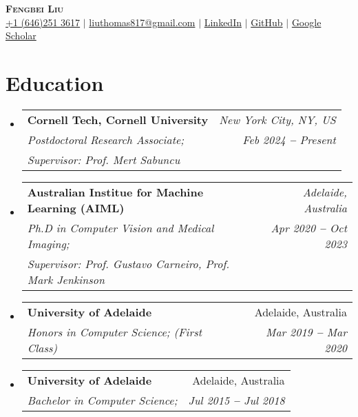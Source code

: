 \documentclass[letterpaper,11pt]{article}
\makeatletter
\newcommand{\resumeSubheading}[4]{
  \vspace{-2pt}\item
    \begin{tabular*}{0.97\textwidth}[t]{l@{\extracolsep{\fill}}r}
      \textbf{#1} & #2 \\
      \textit{\small#3} & \textit{\small #4} \\
    \end{tabular*}\vspace{-7pt}
}
\newcommand{\resumePhdheading}[5]{
  \vspace{-2pt}\item
    \begin{tabular*}{0.97\textwidth}[t]{l@{\extracolsep{\fill}}r}
      \textbf{#1} & \textit{\small #2}\\
      \textit{\small#3} & \textit{\small #4} \\
      \textit{\small #5} \\
    \end{tabular*}\vspace{-7pt}
}
\newcommand{\resumeSubHeadingListStart}{\begin{itemize}[leftmargin=0.15in, label={}]}
\newcommand{\resumeSubHeadingListEnd}{\end{itemize}}
\makeatother
\begin{document}

\begin{center}
    \textbf{\Huge \scshape Fengbei Liu} \\ \vspace{3pt}
    \small
    \faMobile \hspace{.5pt} \href{tel:905314204536}{+1 (646)251 3617}
    $|$
    \faAt \hspace{.5pt} \href{mailto:arasgungore09@gmail.com}{liuthomas817@gmail.com}
    $|$
    \faLinkedinSquare \hspace{.5pt} \href{https://www.linkedin.com/in/fengbei-liu-2bb11b177/}{LinkedIn}
    $|$
    \faGithub \hspace{.5pt} \href{https://github.com/FBLADL?tab=repositories}{GitHub}
    $|$
    \faGlobe \hspace{.5pt} \href{https://scholar.google.com.au/citations?user=oY_qRxMAAAAJ&hl}{Google Scholar}
\end{center}




\section{Education}
  \vspace{3pt}
  \resumeSubHeadingListStart

    

    \resumePhdheading{Cornell Tech, Cornell University}{New York City, NY, US}{Postdoctoral Research Associate; }{Feb 2024 \textbf{--} Present}{Supervisor: Prof. Mert Sabuncu}
    \resumePhdheading
      {Australian Institue for Machine Learning (AIML)
      }{Adelaide, Australia}
      {Ph.D in Computer Vision and Medical Imaging;   }{Apr 2020 \textbf{--} Oct 2023}{Supervisor: Prof. Gustavo Carneiro, Prof. Mark Jenkinson}
    \resumeSubheading{University of Adelaide}{Adelaide, Australia}{Honors in Computer Science; (First Class)}{Mar 2019 \textbf{--} Mar 2020}
    \resumeSubheading{University of Adelaide}{Adelaide, Australia}{Bachelor in Computer Science; }{Jul 2015 \textbf{--} Jul 2018}
  \resumeSubHeadingListEnd
\end{document}
